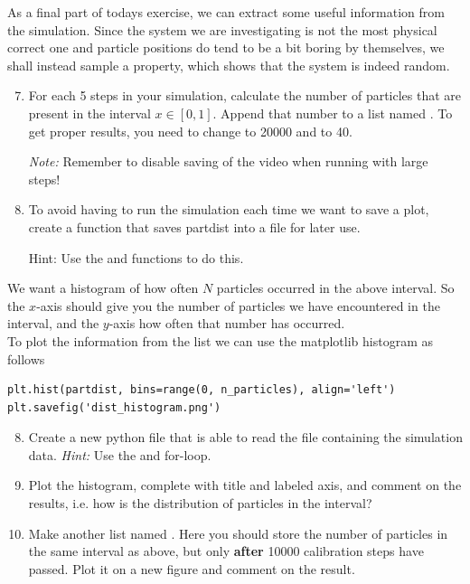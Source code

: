 \documentclass{article}
\begin{document}
As a final part of todays exercise, we can extract some useful information from the simulation.
Since the system we are investigating is not the most physical correct one and particle positions do tend to be a bit boring by themselves, we shall instead sample a property, which shows that the system is indeed random.

\begin{enumerate}
  \setcounter{enumi}{6}
  \item For each 5 steps in your simulation, calculate the number of particles
    that are present in the interval $x \in [0, 1]$.
    Append that number to a list named .
    To get proper results, you need to change  to 20000 and  to 40.

    {\em Note:} Remember to disable saving of the video when running with large steps!

    \item To avoid having to run the simulation each time we want to save a plot, create a function that saves partdist into a file for later use.

    {\en Hint:} Use the  and  functions to do this.

\end{enumerate}


We want a histogram of how often $N$ particles occurred in the above interval.
So the $x$-axis should give you the number of particles we have encountered in the interval, and the $y$-axis how often that number has occurred.\\

To plot the information from the list we can use the matplotlib histogram as follows

\begin{lstlisting}
plt.hist(partdist, bins=range(0, n_particles), align='left')
plt.savefig('dist_histogram.png')
\end{lstlisting}


\begin{enumerate}
  \setcounter{enumi}{7}

  \item Create a new python file that is able to read the file containing the simulation data.
      {\em Hint:} Use the  and for-loop.

  \item Plot the histogram, complete with title and labeled axis, and comment on the results, i.e. how is the     distribution of particles in the interval?

  \item Make another list named . Here you should store the number of particles in the same interval as above, but only {\bf after} 10000 calibration steps have passed.
    Plot it on a new figure and comment on the result.

\end{enumerate}
\end{document}
